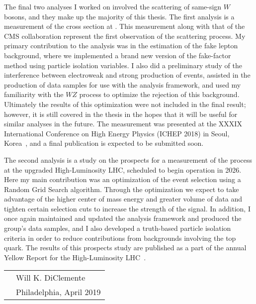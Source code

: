The final two analyses I worked on involved the scattering of same-sign $W$ bosons, and they make up the majority of this thesis.
The first analysis is a measurement of the \ssww cross section at .
This measurement along with that of the CMS collaboration represent the first observation of the \ssww scattering process.
My primary contribution to the analysis was in the estimation of the fake lepton background, where we implemented a brand new version of the fake-factor method using particle isolation variables.
I also did a preliminary study of the interference between electroweak and strong production of \ssww events, assisted in the production of data samples for use with the analysis framework, and used my familiarity with the $WZ$ process to optimize the rejection of this background.
Ultimately the results of this optimization were not included in the final result; however, it is still covered in the thesis in the hopes that it will be useful for similar analyses in the future.
The measurement was presented at the XXXIX International Conference on High Energy Physics (ICHEP 2018) in Seoul, Korea~\cite{2018.ssww-13tev-atlas-conf}, and a final publication is expected to be submitted soon.

The second \ssww analysis is a study on the prospects for a measurement of the process at the upgraded High-Luminosity LHC, scheduled to begin operation in 2026.
Here my main contribution was an optimization of the event selection using a Random Grid Search algorithm.
Through the optimization we expect to take advantage of the higher center of mass energy and greater volume of data and tighten certain selection cuts to increase the strength of the \ssww signal.
In addition, I once again maintained and updated the analysis framework and produced the group's data samples, and I also developed a truth-based particle isolation criteria in order to reduce contributions from backgrounds involving the top quark.
The results of this prospects study are published as a part of the annual Yellow Report for the High-Luminosity LHC~\cite{2019.yellow-report-arxiv}.

\vspace{0.01\textheight}

\begin{tabular}{p{} l}
  & Will K. DiClemente           \\
  & Philadelphia, April 2019  \\
\end{tabular}

